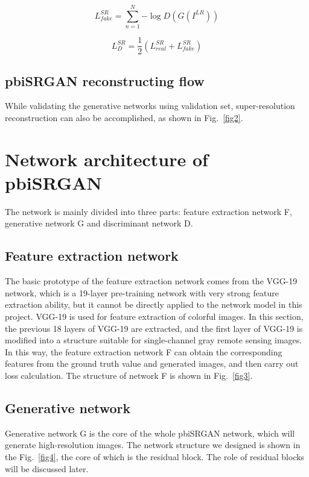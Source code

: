 \documentclass[10pt,twocolumn,letterpaper]{article}
\begin{document}
\begin{equation}\label{eq8}
L_{fake}^{SR} = \sum\limits_{n = 1}^N { - \log D\left( {G\left( {{I^{LR}}} \right)} \right)}
\end{equation}

\begin{equation}\label{eq9}
L_D^{SR} = \frac{1}{2}\left( {L_{real}^{SR} + L_{fake}^{SR}} \right)
\end{equation}

\subsection{pbiSRGAN reconstructing flow}
While validating the generative networks using validation set, super-resolution reconstruction can also be accomplished, as shown in Fig.~\ref{fig2}.

\section{Network architecture of pbiSRGAN}
The network is mainly divided into three parts: feature extraction network F, generative network G and discriminant network D.
\subsection{Feature extraction network}
The basic prototype of the feature extraction network comes from the VGG-19 network, which is a 19-layer pre-training network with very strong feature extraction ability, but it cannot be directly applied to the network model in this project. VGG-19 is used for feature extraction of colorful images. In this section, the previous 18 layers of VGG-19 are extracted, and the first layer of VGG-19 is modified into a structure suitable for single-channel gray remote sensing images. In this way, the feature extraction network F can obtain the corresponding features from the ground truth value and generated images, and then carry out loss calculation. The structure of network F is shown in Fig.~\ref{fig3}.

\subsection{Generative network}
Generative network G is the core of the whole pbiSRGAN network, which will generate high-resolution images. The network structure we designed is shown in the Fig.~\ref{fig4}, the core of which is the residual block. The role of residual blocks will be discussed later.
\end{document}
